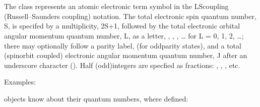 \documentclass[letterpaper,10pt,english]{sphinxmanual}
\begin{document}
\section{}
\label{\detokenize{states:atomictermsymbol}}
The  class represents an atomic electronic term symbol in the LS\sphinxhyphen{}coupling (Russell–Saunders coupling) notation. The total electronic spin quantum number, S, is specifed by a multiplicity, 2S+1, followed by the total electronic orbital angular momentum quantum number, L, as a letter, , , , … for L = 0, 1, 2, …; there may optionally follow a parity label,  (for odd\sphinxhyphen{}parity states), and a total (spin\sphinxhyphen{}orbit coupled) electronic angular momentum quantum number, J after an underscore character (\sphinxcode{\sphinxupquote{\_}}). Half (odd)\sphinxhyphen{}integers are specfied as fractions: , , , etc.

Examples:

\begin{sphinxVerbatim}[commandchars=\\\{\}]
 \PYG{p}{[}\PYG{p}{]}    
 \PYG{p}{[}\PYG{p}{]}   
 \PYG{p}{[}\PYG{p}{]}   
 \PYG{p}{[}\PYG{p}{]}   
\end{sphinxVerbatim}

 objects know about their quantum numbers, where defined:
\end{document}
